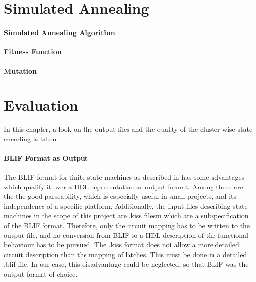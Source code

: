 \chapter{Simulated Annealing}
\label{cha:SimulateAnnealing}

\subsubsection{Simulated Annealing Algorithm}
\label{subsubsec:SAAlgorithm}



\subsubsection{Fitness Function}
\label{subsubsec:FitnessFunction}

\subsubsection{Mutation}
\label{subsubsec:Mutation}



\chapter{Evaluation}
\label{cha:Evaluation}

In this chapter, a look on the output files and the quality of the cluster-wise state encoding is taken.

\subsubsection{BLIF Format as Output}
\label{subsubsec:BLIFOutput}

The BLIF format for finite state machines as described in \cite{blif} has some advantages which qualify it over a HDL representation as output format. Among these are the the good parseability, which is especially useful in small projects, and its independence of a specific platform.
Additionally, the input files describing state machines in the scope of this project are .kiss filesm which are a subspecification of the BLIF format. Therefore, only the circuit mapping has to be written to the output file, and no conversion from BLIF to a HDL description of the functional behaviour has to be pursued. The .kiss format does not allow a more detailed circuit description than the mapping of latches. This must be done in a detailed .blif file. In our case, this disadvantage could be neglected, so that BLIF was the output format of choice.

